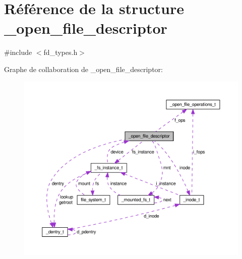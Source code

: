 \hypertarget{struct__open__file__descriptor}{\section{Référence de la structure \-\_\-open\-\_\-file\-\_\-descriptor}
\label{struct__open__file__descriptor}
}


{\ttfamily \#include $<$fd\-\_\-types.\-h$>$}



Graphe de collaboration de \-\_\-open\-\_\-file\-\_\-descriptor\-:\nopagebreak
\begin{figure}[H]
\begin{center}
\leavevmode
\includegraphics[width=350pt]{struct__open__file__descriptor__coll__graph}
\end{center}
\end{figure}

